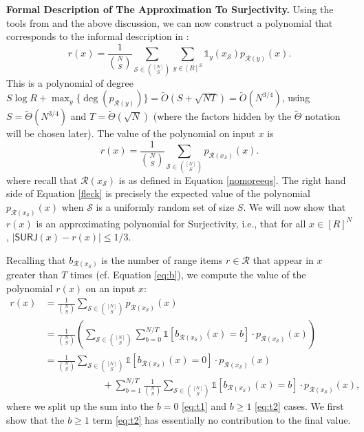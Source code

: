 \documentclass[11pt, letterpaper, fleqn]{article}
\theoremstyle{plain}
\newcommand{\SURJ}{\mathsf{ SURJ}}
\newcommand{\Surjectivity}{Surjectivity}
\newcommand{\tO}{\tilde{O}}
\newcommand{\tTheta}{\tilde{\Theta}}
\newcommand{\id}{{\mathds{1}}}
\newcommand{\Rcal}{\mathcal{R}}
\newcommand{\Scal}{\mathcal{S}}
\begin{document}
\medskip
\noindent \textbf{Formal Description of The Approximation To \Surjectivity.} Using the tools from  and the above discussion, we can now construct a polynomial that corresponds to the informal description in :
\begin{equation}
    r(x) = \frac{1}{\binom{N}{S}} \sum_{\Scal \in \binom{[N]}{S}} \sum_{y \in [R]^S} \id_y(x_\Scal) p_{\Rcal(y)}(x). 
\end{equation}
This is a polynomial of degree $S\log R + \max_{y}\{\deg(p_{\Rcal(y)})\} = \tO(S + \sqrt{NT}) = \tO(N^{3/4})$, using $S=\tTheta(N^{3/4})$ and $T=\tTheta(\sqrt{N})$ (where the factors hidden by the $\tTheta$ notation will be chosen later). The value of the polynomial on input $x$ is
\begin{equation} \label{fleck}
    r(x) = \frac{1}{\binom{N}{S}} \sum_{\Scal \in \binom{[N]}{S}} p_{\Rcal(x_\Scal)}(x). 
\end{equation}
where recall that $\Rcal(x_{\Scal})$ is as defined in Equation \eqref{nomoreeqs}.
The right hand side of Equation \eqref{fleck} is precisely the expected value of the polynomial $p_{\Rcal(x_\Scal)}(x)$ when $\Scal$ is a uniformly random set of size $S$. We will now show that $r(x)$ is an approximating polynomial for \Surjectivity, i.e., that for all $x\in[R]^N$, $|\SURJ(x)-r(x)|\leq 1/3$.




Recalling that $b_{\Rcal(x_\Scal)}$ is the number of range items $r \in \Rcal$ that appear in $x$ greater than $T$ times (cf. Equation \eqref{eq:b}),
we compute the value of the polynomial $r(x)$ on an input $x$:
\begin{align}
    r(x) &= \frac{1}{\binom{N}{S}} \sum_{\Scal \in \binom{[N]}{S}} p_{\Rcal(x_\Scal)}(x) \\
    &= \frac{1}{\binom{N}{S}} \left(\sum_{\Scal \in \binom{[N]}{S}} \sum_{b=0}^{N/T} \id[b_{\Rcal(x_\Scal)}(x)=b] \cdot p_{\Rcal(x_\Scal)}(x) \right)\\
    &= \frac{1}{\binom{N}{S}} \sum_{\Scal \in \binom{[N]}{S}} \id[b_{\Rcal(x_\Scal)}(x)=0] \cdot p_{\Rcal(x_\Scal)}(x) \label{eq:t1}\\
    &\qquad\qquad\qquad + \sum_{b=1}^{N/T} \frac{1}{\binom{N}{S}} \sum_{\Scal \in \binom{[N]}{S}}  \id[b_{\Rcal(x_\Scal)}(x)=b]  \cdot p_{\Rcal(x_\Scal)}(x),
    \label{eq:t2}
\end{align}
where we split up the sum into the $b=0$ \eqref{eq:t1} and $b\geq 1$ \eqref{eq:t2}  cases.
We first show that the $b\geq1$ term \eqref{eq:t2} has essentially no contribution to the final value. 
\end{document}
